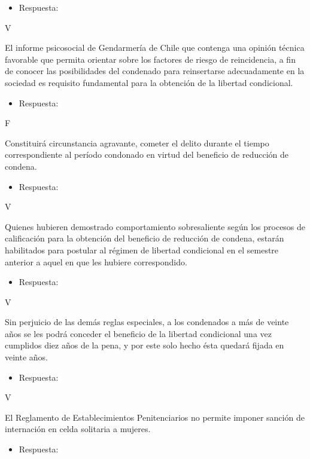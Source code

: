 \documentclass[letterpaper, 11pt]{article}
\begin{document}
\begin{itemize}
\item Respuesta:
\end{itemize}

V

El informe psicosocial de Gendarmería de Chile que contenga una
opinión técnica favorable que permita orientar sobre los factores de
riesgo de reincidencia, a fin de conocer las posibilidades del
condenado para reinsertarse adecuadamente en la sociedad es requisito
fundamental para la obtención de la libertad condicional.


\begin{itemize}
\item Respuesta:
\end{itemize}

F


Constituirá circunstancia agravante, cometer el delito durante el
tiempo correspondiente al período condonado en virtud del beneficio de
reducción de condena.


\begin{itemize}
\item Respuesta:
\end{itemize}

V

Quienes hubieren demostrado comportamiento sobresaliente según los
procesos de calificación para la obtención del beneficio de reducción
de condena, estarán habilitados para postular al régimen de libertad
condicional en el semestre anterior a aquel en que les hubiere
correspondido.


\begin{itemize}
\item Respuesta:
\end{itemize}

V


Sin perjuicio de las demás reglas especiales, a los condenados a más
de veinte años se les podrá conceder el beneficio de la libertad
condicional una vez cumplidos diez años de la pena, y por este solo
hecho ésta quedará fijada en veinte años.


\begin{itemize}
\item Respuesta:
\end{itemize}

V

El Reglamento de Establecimientos Penitenciarios no permite imponer
sanción de internación en celda solitaria a mujeres.


\begin{itemize}
\item Respuesta:
\end{itemize}
\end{document}
